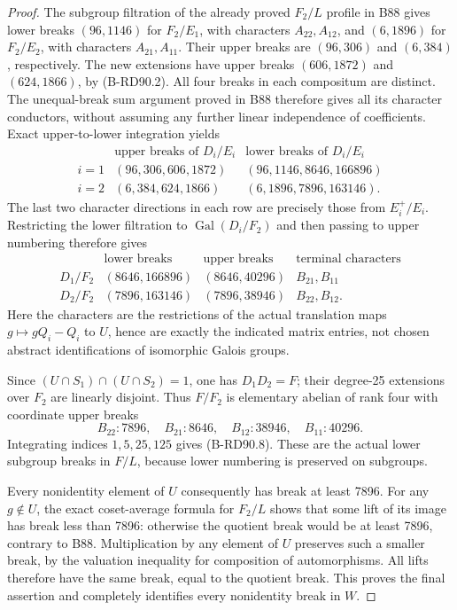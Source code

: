 \begin{proof}
The subgroup filtration of the already proved \(F_2/L\) profile
in B88 gives lower breaks \((96,1146)\) for \(F_2/E_1\), with
characters \(A_{22},A_{12}\), and \((6,1896)\) for \(F_2/E_2\),
with characters \(A_{21},A_{11}\). Their upper breaks are
\((96,306)\) and \((6,384)\), respectively. The new extensions
have upper breaks \((606,1872)\) and \((624,1866)\), by
(B-RD90.2). All four breaks in each compositum are distinct.
The unequal-break sum argument proved in B88 therefore gives
all its character conductors, without assuming any further
linear independence of coefficients. Exact upper-to-lower
integration yields
\[
\begin{array}{c|c|c}
 &\text{upper breaks of }D_i/E_i&\text{lower breaks of }D_i/E_i\\\hline
 i=1&(96,306,606,1872)&(96,1146,8646,166896)\\
 i=2&(6,384,624,1866)&(6,1896,7896,163146).
\end{array}                                                   \tag{B-RD90.11}
\]
The last two character directions in each row are precisely
those from \(E_i^+/E_i\). Restricting the lower filtration to
\(\operatorname{Gal}(D_i/F_2)\) and then passing to upper
numbering therefore gives
\[
\begin{array}{c|c|c|c}
 &\text{lower breaks}&\text{upper breaks}&\text{terminal characters}\\\hline
 D_1/F_2&(8646,166896)&(8646,40296)&B_{21},B_{11}\\
 D_2/F_2&(7896,163146)&(7896,38946)&B_{22},B_{12}.
\end{array}                                                   \tag{B-RD90.12}
\]
Here the characters are the restrictions of the actual
translation maps \(g\mapsto gQ_i-Q_i\) to \(U\), hence are
exactly the indicated matrix entries, not chosen abstract
identifications of isomorphic Galois groups.

Since \((U\cap S_1)\cap(U\cap S_2)=1\), one has
\(D_1D_2=F\); their degree-25 extensions over \(F_2\) are
linearly disjoint. Thus \(F/F_2\) is elementary abelian of
rank four with coordinate upper breaks
\[
       B_{22}:7896,\quad B_{21}:8646,\quad
       B_{12}:38946,\quad B_{11}:40296.
 \tag{B-RD90.13}
\]
Integrating indices \(1,5,25,125\) gives (B-RD90.8).
These are the actual lower subgroup breaks in \(F/L\),
because lower numbering is preserved on subgroups.

Every nonidentity element of \(U\) consequently has break
at least 7896. For any \(g\notin U\), the exact coset-average
formula for \(F_2/L\) shows that some lift of its image has
break less than 7896: otherwise the quotient break would
be at least 7896, contrary to B88. Multiplication by any
element of \(U\) preserves such a smaller break, by the
valuation inequality for composition of automorphisms.
All lifts therefore have the same break, equal to the
quotient break. This proves the final assertion and
completely identifies every nonidentity break in \(W\).


\end{proof}
